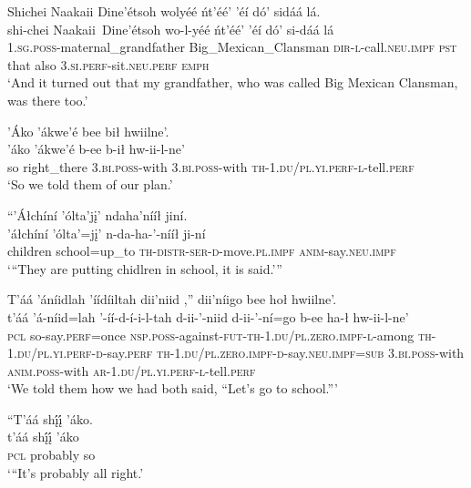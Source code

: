 \ea\label{ex:text1-14-4}
Shichei Naakaii Dine’étsoh wolyéé ńt’éé’ ’éí dó’ sidáá lá.\\
\gll shi-chei	Naakaii~{Dine’étsoh}	wo-l-yéé	ńt’éé’	’éí	dó’	si-dáá	lá\\
     1.\textsc{sg}.\textsc{poss}-maternal\_grandfather	Big\_Mexican\_Clansman	\textsc{dir}-\textsc{l}-call.\textsc{neu}.\textsc{impf}	\textsc{pst}	that	also	3.\textsc{si}.\textsc{perf}-sit.\textsc{neu}.\textsc{perf}	\textsc{emph}\\
\glt `And it turned out that my grandfather, who was called Big Mexican Clansman, was there too.'
\z

\ea\label{ex:text1-14-5}
’Áko ’ákwe’é bee bił hwiilne’.\\
\gll ’áko	’ákwe’é	b-ee	b-ił	hw-ii-l-ne’\\
     so	right\_there	3.\textsc{bi}.\textsc{poss}-with	3.\textsc{bi}.\textsc{poss}-with	\textsc{th}-1.\textsc{du}/\textsc{pl}.\textsc{yi}.\textsc{perf}-\textsc{l}-tell.\textsc{perf}\\
\glt `So we told them of our plan.'
\z

\ea\label{ex:text1-14-6}
``’Áłchíní ’ólta’jį’ ndaha’nííł jiní.\\
\gll ’áłchíní	’ólta’=jį’	n-da-ha-’-nííł	ji-ní\\
     children	school=up\_to	\textsc{th}-\textsc{distr}-\textsc{ser}-\textsc{d}-move.\textsc{pl}.\textsc{impf}	\textsc{anim}-say.\textsc{neu}.\textsc{impf}\\
\glt `{``}They are putting chidlren in school, it is said.'''
\z

\ea\label{ex:text1-14-7}
T’áá ’áníidlah ’íídíiltah dii’niid ,'' dii’níigo bee hoł hwiilne’.\\
\gll t’áá	’á-níid=lah	’-íí-d-í-i-l-tah	d-ii-’-niid	d-ii-’-ní=go	b-ee	ha-ł	hw-ii-l-ne’\\
     \textsc{pcl}	so-say.\textsc{perf}=once	\textsc{nsp}.\textsc{poss}-against-\textsc{fut}-\textsc{th}-1.\textsc{du}/\textsc{pl}.\textsc{zero}.\textsc{impf}-\textsc{l}-among	\textsc{th}-1.\textsc{du}/\textsc{pl}.\textsc{yi}.\textsc{perf}-\textsc{d}-say.\textsc{perf}	\textsc{th}-1.\textsc{du}/\textsc{pl}.\textsc{zero}.\textsc{impf}-\textsc{d}-say.\textsc{neu}.\textsc{impf}=\textsc{sub}	3.\textsc{bi}.\textsc{poss}-with	\textsc{anim}.\textsc{poss}-with	\textsc{ar}-1.\textsc{du}/\textsc{pl}.\textsc{yi}.\textsc{perf}-\textsc{l}-tell.\textsc{perf}\\
\glt `We told them how we had both said, ``Let's go to school.'''
\z

\ea\label{ex:text1-15-1}
``T’áá shį́į́ ’áko.\\
\gll t’áá	shį́į́	’áko\\
     \textsc{pcl}	probably	so\\
\glt `{``}It's probably all right.'
\z

